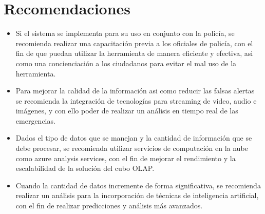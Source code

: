 \section{Recomendaciones}

\begin{itemize}
    \item Si el sistema se implementa para su uso en conjunto con la policía, se recomienda realizar una capacitación
          previa a los oficiales de policía, con el fin de que puedan utilizar la herramienta de manera eficiente y
          efectiva, asi como una concienciación a los ciudadanos para evitar el mal uso de la herramienta.

    \item Para mejorar la calidad de la información asi como reducir las falsas alertas se recomienda la integración
          de tecnologías para streaming de video, audio e imágenes, y con ello poder  de realizar un análisis en
          tiempo real de las emergencias.

    \item Dados el tipo de datos que se manejan y la cantidad de información que se debe procesar, se recomienda
          utilizar servicios de computación en la nube como azure analysis services, con el fin de mejorar el
          rendimiento y la escalabilidad de la solución del cubo OLAP.

    \item Cuando la cantidad de datos incremente de forma significativa, se recomienda realizar un análisis para la
          incorporación de técnicas de inteligencia artificial, con el fin de realizar predicciones y análisis más
          avanzados.
\end{itemize}